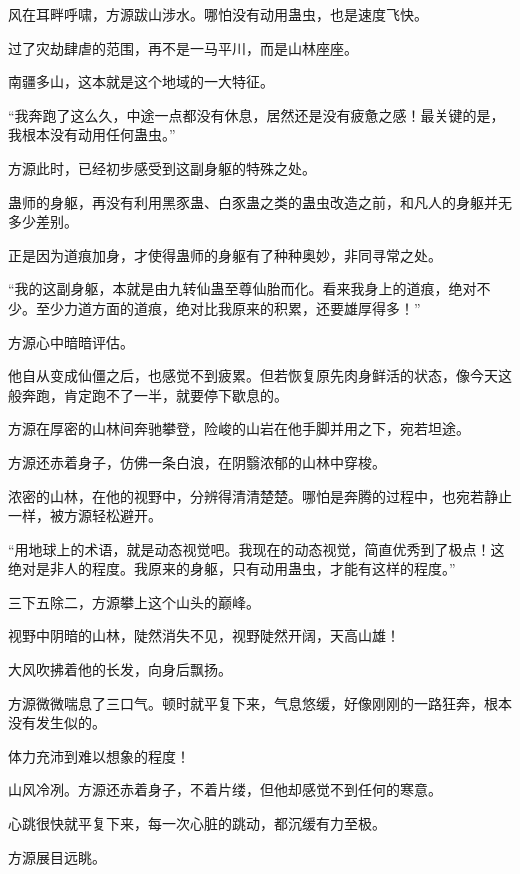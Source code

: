
\begin{this_body}



风在耳畔呼啸，方源跋山涉水。哪怕没有动用蛊虫，也是速度飞快。

过了灾劫肆虐的范围，再不是一马平川，而是山林座座。

南疆多山，这本就是这个地域的一大特征。

“我奔跑了这么久，中途一点都没有休息，居然还是没有疲惫之感！最关键的是，我根本没有动用任何蛊虫。”

方源此时，已经初步感受到这副身躯的特殊之处。

蛊师的身躯，再没有利用黑豕蛊、白豕蛊之类的蛊虫改造之前，和凡人的身躯并无多少差别。

正是因为道痕加身，才使得蛊师的身躯有了种种奥妙，非同寻常之处。

“我的这副身躯，本就是由九转仙蛊至尊仙胎而化。看来我身上的道痕，绝对不少。至少力道方面的道痕，绝对比我原来的积累，还要雄厚得多！”

方源心中暗暗评估。

他自从变成仙僵之后，也感觉不到疲累。但若恢复原先肉身鲜活的状态，像今天这般奔跑，肯定跑不了一半，就要停下歇息的。

方源在厚密的山林间奔驰攀登，险峻的山岩在他手脚并用之下，宛若坦途。

方源还赤着身子，仿佛一条白浪，在阴翳浓郁的山林中穿梭。

浓密的山林，在他的视野中，分辨得清清楚楚。哪怕是奔腾的过程中，也宛若静止一样，被方源轻松避开。

“用地球上的术语，就是动态视觉吧。我现在的动态视觉，简直优秀到了极点！这绝对是非人的程度。我原来的身躯，只有动用蛊虫，才能有这样的程度。”

三下五除二，方源攀上这个山头的巅峰。

视野中阴暗的山林，陡然消失不见，视野陡然开阔，天高山雄！

大风吹拂着他的长发，向身后飘扬。

方源微微喘息了三口气。顿时就平复下来，气息悠缓，好像刚刚的一路狂奔，根本没有发生似的。

体力充沛到难以想象的程度！

山风冷冽。方源还赤着身子，不着片缕，但他却感觉不到任何的寒意。

心跳很快就平复下来，每一次心脏的跳动，都沉缓有力至极。

方源展目远眺。


\end{this_body}

